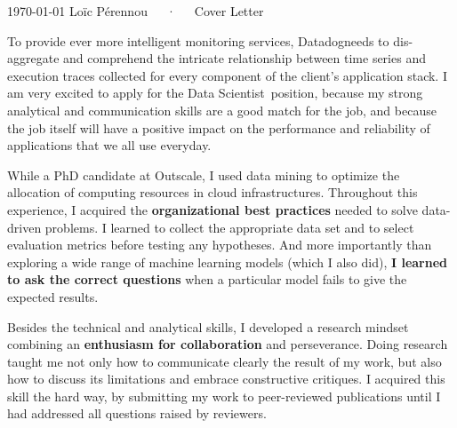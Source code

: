 \documentclass[11pt, a4paper]{awesome-cv}
\newcommand{\company}{Datadog}
\newcommand{\job}{Data Scientist}
\begin{document}
\makecvheader[R]

\makecvfooter
  {\today}
  {Loïc Pérennou~~~·~~~Cover Letter}
  {}

\makelettertitle

\begin{cvletter}
  To provide ever more intelligent monitoring services, \company needs to dis-aggregate and comprehend the intricate relationship between time series and execution traces collected for every component of the client's application stack. 
  I am very excited to apply for the \job~position, because my strong analytical and communication skills are a good match for the job, and because the job itself will have a positive impact on the performance and reliability of applications that we all use everyday.  

While a PhD candidate at Outscale, I used data mining to optimize the allocation of computing resources in cloud infrastructures. 
Throughout this experience, I acquired the \textbf{organizational best practices} needed to solve data-driven problems.  
I learned to collect the appropriate data set and to select evaluation metrics before testing any hypotheses. 
And more importantly than exploring a wide range of machine learning models (which I also did), \textbf{I learned to ask the correct questions} when a particular model fails to give the expected results.  

Besides the technical and analytical skills, I developed a research mindset combining an \textbf{enthusiasm for collaboration} and perseverance.  
Doing research taught me not only how to communicate clearly the result of my work, but also how to discuss its limitations and embrace constructive critiques.  
I acquired this skill the hard way, by submitting my work to peer-reviewed publications until I had addressed all questions raised by reviewers. 


\end{cvletter}
\end{document}
